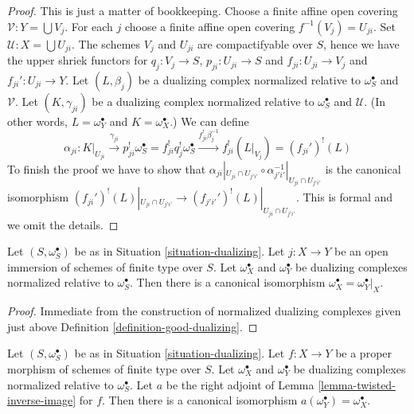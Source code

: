 \begin{proof}
This is just a matter of bookkeeping.
Choose a finite affine open covering $\mathcal{V} : Y = \bigcup V_j$.
For each $j$ choose a finite affine open covering $f^{-1}(V_j) = U_{ji}$.
Set $\mathcal{U} : X = \bigcup U_{ji}$. The schemes $V_j$ and $U_{ji}$ are
compactifyable over $S$, hence we have the upper shriek functors for
$q_j : V_j \to S$, $p_{ji} : U_{ji} \to S$ and
$f_{ji} : U_{ji} \to V_j$ and $f_{ji}' : U_{ji} \to Y$.
Let $(L, \beta_j)$ be a dualizing complex normalized relative to
$\omega_S^\bullet$ and $\mathcal{V}$.
Let $(K, \gamma_{ji})$ be a dualizing complex normalized relative to
$\omega_S^\bullet$ and $\mathcal{U}$.
(In other words, $L = \omega_Y^\bullet$ and $K = \omega_X^\bullet$.)
We can define
$$
\alpha_{ji} :
K|_{U_{ji}} \xrightarrow{\gamma_{ji}}
p_{ji}^!\omega_S^\bullet = f_{ji}^!q_j^!\omega_S^\bullet
\xrightarrow{f_{ji}^!\beta_j^{-1}} f_{ji}^!(L|_{V_j}) =
(f_{ji}')^!(L)
$$
To finish the proof we have to show that
$\alpha_{ji}|_{U_{ji} \cap U_{j'i'}}
\circ \alpha_{j'i'}^{-1}|_{U_{ji} \cap U_{j'i'}}$
is the canonical isomorphism
$(f_{ji}')^!(L)|_{U_{ji} \cap U_{j'i'}} \to
(f_{j'i'}')^!(L)|_{U_{ji} \cap U_{j'i'}}$. This is formal and we
omit the details.
\end{proof}

\begin{lemma}
\label{lemma-open-immersion-good-dualizing-complex}
Let $(S, \omega_S^\bullet)$ be as in Situation \ref{situation-dualizing}.
Let $j : X \to Y$ be an open immersion of schemes of finite type over $S$.
Let $\omega_X^\bullet$ and $\omega_Y^\bullet$ be dualizing complexes
normalized relative to $\omega_S^\bullet$. Then there is a canonical
isomorphism $\omega_X^\bullet = \omega_Y^\bullet|_X$.
\end{lemma}

\begin{proof}
Immediate from the construction of normalized dualizing complexes
given just above
Definition \ref{definition-good-dualizing}.
\end{proof}

\begin{lemma}
\label{lemma-proper-map-good-dualizing-complex}
Let $(S, \omega_S^\bullet)$ be as in Situation \ref{situation-dualizing}.
Let $f : X \to Y$ be a proper morphism of schemes of finite type over $S$.
Let $\omega_X^\bullet$ and $\omega_Y^\bullet$ be dualizing complexes
normalized relative to $\omega_S^\bullet$. Let $a$ be the
right adjoint of Lemma \ref{lemma-twisted-inverse-image} for
$f$. Then there is a canonical isomorphism
$a(\omega_Y^\bullet) = \omega_X^\bullet$.
\end{lemma}

